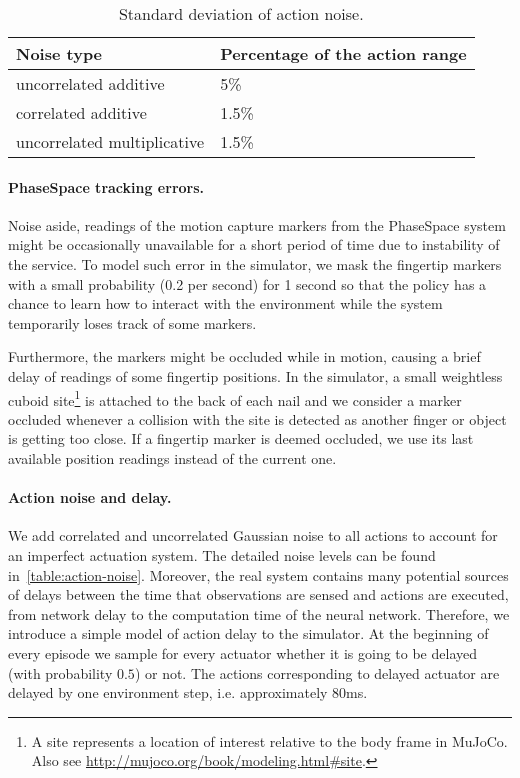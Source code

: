 \begin{table}
    \footnotesize
    \centering
    \caption{Standard deviation of action noise.}
    \renewcommand{\arraystretch}{1.3}
    \begin{tabular}{@{}ll@{}}
        \toprule
        \textbf{Noise type} & \textbf{Percentage of the action range} \\ \midrule
        uncorrelated additive & 5\% \\
        correlated additive & 1.5\% \\
        uncorrelated multiplicative & 1.5\% \\
        \bottomrule
    \end{tabular}
\label{table:action-noise}
\end{table}

\paragraph{PhaseSpace tracking errors.}
Noise aside, readings of the motion capture markers from the PhaseSpace system might be occasionally unavailable for a short period of time due to instability of the service. To model such error in the simulator, we mask the fingertip markers with a small probability (0.2 per second) for 1 second so that the policy has a chance to learn how to interact with the environment while the system temporarily loses track of some markers. 

Furthermore, the markers might be occluded while in motion, causing a brief delay of readings of some fingertip positions. In the simulator, a small weightless cuboid site\footnote{A site represents a location of interest relative to the body frame in MuJoCo. Also see \url{http://mujoco.org/book/modeling.html\#site}.} is attached to the back of each nail and we consider a marker occluded whenever a collision with the site is detected as another finger or object is getting too close. If a fingertip marker is deemed occluded, we use its last available position readings instead of the current one.



\paragraph{Action noise and delay.}
We add correlated and uncorrelated Gaussian noise to all actions to account for an imperfect actuation 
system.
The detailed noise levels can be found in~\autoref{table:action-noise}.
Moreover, the real system contains many potential sources of delays between the time that observations are sensed and actions are executed,
from network delay to the computation time of the neural network.
Therefore, we introduce a simple model of action delay to the simulator.
At the beginning of every episode we sample for every actuator whether
it is going to be delayed (with probability $0.5$) or not.
The actions corresponding to delayed actuator are delayed by one environment step, i.e. approximately $80$ms.


